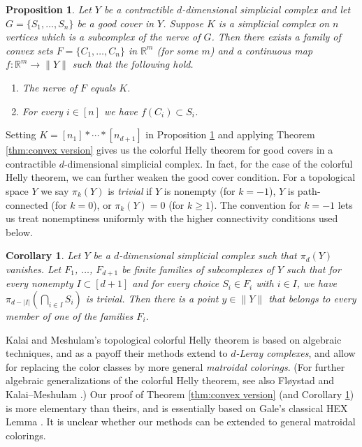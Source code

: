 \documentclass[12pt,a4paper,oneside]{amsart}\sloppy
\newtheorem{prop}[theorem]{Proposition}
\newtheorem{corollary}[theorem]{Corollary}
\theoremstyle{definition}
\begin{document}
\begin{prop}\label{prop:good covers}
Let $Y$ be a contractible $d$-dimensional simplicial complex and let $G  =\{S_1, \dots, S_n\}$ be a good cover in $Y$. Suppose $K$ is a simplicial complex on $n$ vertices which is a subcomplex of the nerve of $G$. Then there exists a family of convex sets $F = \{C_1, \dots, C_n\}$ in $\mathbb{R}^{m}$ (for some $m$) and a continuous map $f \colon \mathbb{R}^{m} \to \|Y\|$ such that the following hold.
\begin{enumerate}
\item \label{condition: nerve} The nerve of $F$ equals $K$.
\item \label{condition: containment} For every $i\in [n]$ we have $f(C_i)\subset S_i$.
\end{enumerate}
\end{prop}

Setting $K = [n_1]* \cdots * [n_{d+1}]$ in Proposition \ref{prop:good covers} and applying Theorem \ref{thm:convex version} gives us the colorful Helly theorem for good covers in a contractible $d$-dimensional simplicial complex. In fact, for the case of the colorful Helly theorem, we can further weaken the good cover condition. For a topological space $Y$ we say $\pi_k(Y)$ is \emph{trivial} if $Y$ is nonempty (for $k=-1$), $Y$ is path-connected (for $k=0$), or $\pi_k(Y)=0$ (for $k\geq 1$). The convention for $k=-1$ lets us treat nonemptiness uniformly with the higher connectivity conditions used below.

\begin{corollary}\label{cor:good covers}
Let $Y$ be a $d$-dimensional simplicial complex such that $\pi_d(Y)$ vanishes. Let $F_1$, $\dots$, $F_{d+1}$ be finite families of subcomplexes of $Y$ such that for every nonempty $I\subset [d+1]$ and for every choice $S_i\in F_i$ with $i\in I$, we have $\pi_{d-|I|}(\bigcap_{i\in I}S_i)$ is trivial. Then there is a point $y\in \|Y\|$ that belongs to every member of one of the families $F_i$.  \end{corollary}

Kalai and Meshulam's topological colorful Helly theorem is based on algebraic techniques, and as a payoff their methods extend to \emph{$d$-Leray complexes}, and allow for replacing the color classes by more general \emph{matroidal colorings}. (For further algebraic generalizations of the colorful Helly theorem, see also Fl{\o}ystad \cite{Floystad2011} and Kalai--Meshulam \cite{KalaiMeshulam2021}.) Our proof of Theorem \ref{thm:convex version} (and Corollary \ref{cor:good covers}) is more elementary than theirs, and is essentially based on Gale's classical HEX Lemma \cite{Gale1979}. It is unclear whether our methods can be extended to general matroidal colorings. 
\end{document}
